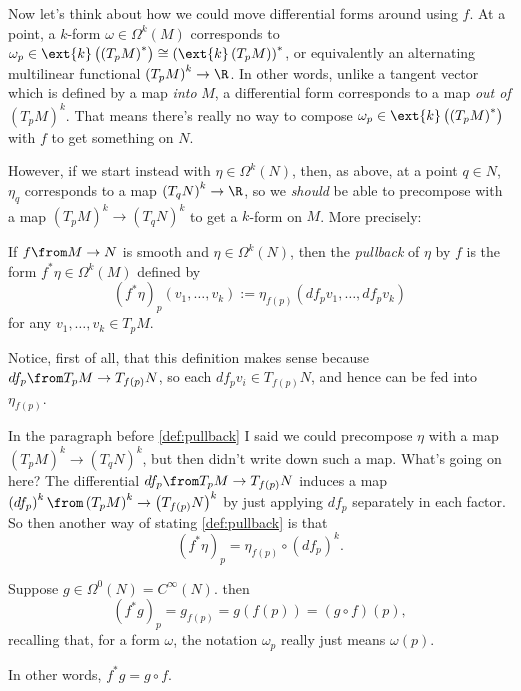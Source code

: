Now let's think about how we could move differential forms around using $f$. At a point, a $k$-form $\omega \in \Omega^k(M)$ corresponds to $\omega_p \in \ext{k}\left(\left(T_pM\right)^\ast\right) \cong \left(\ext{k}\left(T_pM\right)\right)^\ast$, or equivalently an alternating multilinear functional $\left(T_pM\right)^k \to \R$. In other words, unlike a tangent vector which is defined by a map \emph{into} $M$, a differential form corresponds to a map \emph{out of} $\left(T_pM\right)^k$. That means there's really no way to compose $\omega_p \in \ext{k}\left(\left(T_pM\right)^\ast\right)$ with $f$ to get something on $N$.

However, if we start instead with $\eta \in \Omega^k(N)$, then, as above, at a point $q \in N$, $\eta_q$ corresponds to a map $\left(T_qN\right)^k \to \R$, so we \emph{should} be able to precompose with a map $\left(T_pM\right)^k \to \left(T_q N \right)^k$ to get a $k$-form on $M$. More precisely:

\begin{definition}\label{def:pullback}
	If $f \from M \to N$ is smooth and $\eta \in \Omega^k(N)$, then the \emph{pullback} of $\eta$ by $f$ is the form $f^\ast \eta \in \Omega^k(M)$ defined by
	\[
		(f^\ast \eta)_p(v_1, \dots , v_k) := \eta_{f(p)}(df_p v_1, \dots, df_pv_k)
	\]
	for any $v_1, \dots , v_k \in T_pM$.
\end{definition}

Notice, first of all, that this definition makes sense because $df_p\from T_pM \to T_{f(p)}N$, so each $df_p v_i \in T_{f(p)}N$, and hence can be fed into $\eta_{f(p)}$. 

In the paragraph before \cref{def:pullback} I said we could precompose $\eta$ with a map $\left(T_pM\right)^k \to \left(T_q N \right)^k$, but then didn't write down such a map. What's going on here? The differential $df_p \from T_p M \to T_{f(p)}N$ induces a map $\left(df_p\right)^k \from \left(T_p M\right)^k \to \left(T_{f(p)}N\right)^k$ by just applying $df_p$ separately in each factor. So then another way of stating \cref{def:pullback} is that 
\[ 
	(f^\ast \eta)_p = \eta_{f(p)} \circ (df_p)^k.
\]

\begin{example}
	Suppose $g \in \Omega^0(N) = C^\infty(N)$. then 
	\[
		(f^\ast g)_p = g_{f(p)} = g(f(p)) = (g \circ f)(p),
	\]
	recalling that, for a form $\omega$, the notation $\omega_p$ really just means $\omega(p)$.
	
	In other words, $f^\ast g = g \circ f$.
\end{example}

